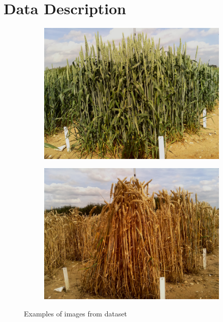 \section{Data Description}
\begin{figure}[ht!]
\begin{subfigure}{.5\textwidth}
\includegraphics[width=.9\linewidth,height=.7\linewidth,keepaspectratio]{wheat_1.jpg}
  \label{fig:sub1}
\end{subfigure}%
\begin{subfigure}{.5\textwidth}
 \includegraphics[width=.9\linewidth,height=.7\linewidth,keepaspectratio]{wheat_2.jpg}
  \label{fig:sub2}
\end{subfigure}
\caption{Examples of images from dataset}
\label{fig:test}
\end{figure}
